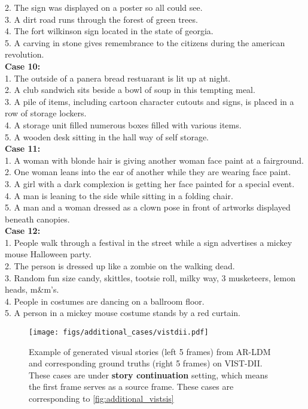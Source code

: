 \documentclass[10pt,twocolumn,letterpaper]{article}
\begin{document}
{{2. The sign was displayed on a poster so all could see.\\
3. A dirt road runs through the forest of green trees.\\
4. The fort wilkinson sign located in the state of georgia.\\
5. A carving in stone gives remembrance to the citizens during the american revolution.\\
\textbf{Case 10:}\\
1. The outside of a panera bread restuarant is lit up at night.\\
2. A club sandwich sits beside a bowl of soup in this tempting meal.\\
3. A pile of items, including cartoon character cutouts and signs, is placed in a row of storage lockers.\\
4. A storage unit filled numerous boxes filled with various items.\\
5. A wooden desk sitting in the hall way of self storage.\\
\textbf{Case 11:}\\
1. A woman with blonde hair is giving another woman face paint at a fairground.\\
2. One woman leans into the ear of another while they are wearing face paint.\\
3. A girl with a dark complexion is getting her face painted for a special event.\\
4. A man is leaning to the side while sitting in a folding chair.\\
5. A man and a woman dressed as a clown pose in front of artworks displayed beneath canopies.\\
\textbf{Case 12:}\\
1. People walk through a festival in the street while a sign advertises a mickey mouse Halloween party.\\
2. The person is dressed up like a zombie on the walking dead.\\
3. Random fun size candy, skittles, tootsie roll, milky way, 3 musketeers, lemon heads, m\&m's.\\
4. People in costumes are dancing on a ballroom floor.\\
5. A person in a mickey mouse costume stands by a red curtain.\\
}}

\begin{figure*}[!th]
\centering
\texttt{[image: figs/additional\_cases/vistdii.pdf]}
\caption{Example of generated visual stories (left 5 frames) from AR-LDM and corresponding ground truths (right 5 frames) on VIST-DII. These cases are under \textbf{story continuation} setting, which means the first frame serves as a source frame. These cases are corresponding to \cref{fig:additional_vistsis}}
\label{fig:additional_vistdii}
\end{figure*}
\end{document}

